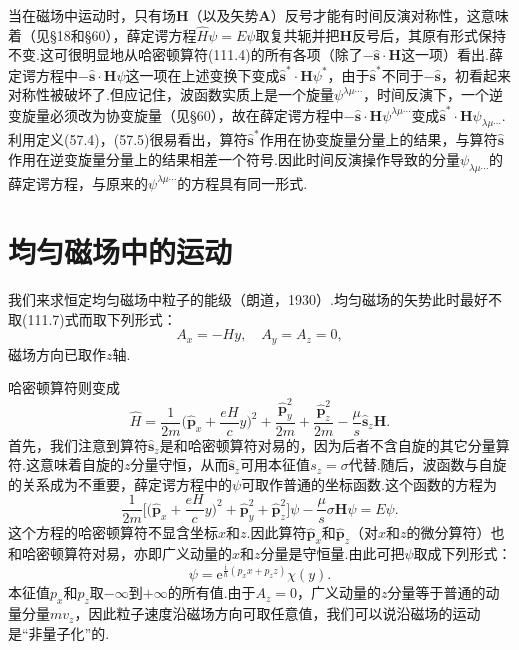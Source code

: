 当在磁场中运动时，只有场$\boldsymbol{H}$（以及矢势$\boldsymbol{A}$）反号才能有时间反演对称性，这意味着（见§18和§60），薛定谔方程$\hat{H}\psi=E\psi$取复共轭并把$\boldsymbol{H}$反号后，其原有形式保持不变.这可很明显地从哈密顿算符(111.4)的所有各项（除了$-\hat{\boldsymbol{s}}\cdot\boldsymbol{H}$这一项）看出.薛定谔方程中$-\hat{\boldsymbol{s}}\cdot\boldsymbol{H}\psi$这一项在上述变换下变成$\hat{\boldsymbol{s}}^*\cdot\boldsymbol{H}\psi^*$，由于$\hat{\boldsymbol{s}}^*$不同于$-\hat{\boldsymbol{s}}$，初看起来对称性被破坏了.但应记住，波函数实质上是一个旋量$\psi^{\lambda\mu\cdots}$，时间反演下，一个逆变旋量必须改为协变旋量（见§60），故在薛定谔方程中$-\hat{\boldsymbol{s}}\cdot\boldsymbol{H}\psi^{\lambda\mu\cdots}$变成$\hat{\boldsymbol{s}}^*\cdot\boldsymbol{H}\psi_{\lambda\mu\cdots}$.利用定义(57.4)，(57.5)很易看出，算符$\hat{\boldsymbol{s}}^*$作用在协变旋量分量上的结果，与算符$\hat{\boldsymbol{s}}$作用在逆变旋量分量上的结果相差一个符号.因此时间反演操作导致的分量$\psi_{\lambda\mu\cdots}$的薛定谔方程，与原来的$\psi^{\lambda\mu\cdots}$的方程具有同一形式.

\section{均匀磁场中的运动}

我们来求恒定均匀磁场中粒子的能级（朗道，1930）.均匀磁场的矢势此时最好不取(111.7)式而取下列形式：
\begin{equation}
  A_x=-Hy,\quad A_y=A_z=0,
\end{equation}
磁场方向已取作$z$轴.

哈密顿算符则变成
\begin{equation}
  \hat{H}=\frac{1}{2m}\biggl(\hat{\boldsymbol{p}}_x+\frac{eH}{c}y\biggr)^2
  +\frac{\hat{\boldsymbol{p}}_y^2}{2m}+\frac{\hat{\boldsymbol{p}}_z^2}{2m}
  -\frac{\mu}{s}\hat{\boldsymbol{s}}_z\boldsymbol{H}.
\end{equation}
首先，我们注意到算符$\hat{\boldsymbol{s}}_z$是和哈密顿算符对易的，因为后者不含自旋的其它分量算符.这意味着自旋的$z$分量守恒，从而$\hat{\boldsymbol{s}}_z$可用本征值$s_z=\sigma$代替.随后，波函数与自旋的关系成为不重要，薛定谔方程中的$\psi$可取作普通的坐标函数.这个函数的方程为
\begin{equation}
  \frac{1}{2m}\biggl[\biggl(\hat{\boldsymbol{p}}_x+\frac{eH}{c}y\biggr)^2
  +\hat{\boldsymbol{p}}_y^2+\hat{\boldsymbol{p}}_z^2\biggr]\psi
  -\frac{\mu}{s}\sigma\boldsymbol{H}\psi=E\psi.
\end{equation}
这个方程的哈密顿算符不显含坐标$x$和$z$.因此算符$\hat{\boldsymbol{p}}_x$和$\hat{\boldsymbol{p}}_z$（对$x$和$z$的微分算符）也和哈密顿算符对易，亦即广义动量的$x$和$z$分量是守恒量.由此可把$\psi$取成下列形式：
\begin{equation}
  \psi=\mathrm{e}^{\frac{\mathrm{i}}{\hbar}(p_xx+p_zz)}\chi(y).
\end{equation}
本征值$p_x$和$p_z$取$-\infty$到$+\infty$的所有值.由于$A_z=0$，广义动量的$z$分量等于普通的动量分量$mv_z$，因此粒子速度沿磁场方向可取任意值，我们可以说沿磁场的运动是“非量子化”的.

